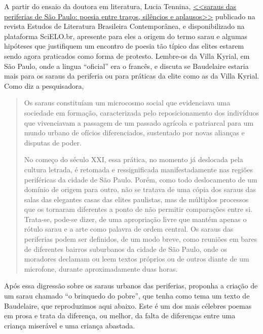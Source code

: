 \documentclass[12pt]{extarticle}
\begin{document}
A partir do ensaio da doutora em literatura, Lucia Tennina, 
\href{http://www.scielo.br/pdf/elbc/n42/01.pdf}{<<saraus das periferias de São Paulo:
poesia entre tragos, silêncios e aplausos>>} publicado na revista 
Estudos de Literatura Brasileira Contemporânea, e disponibilizado 
na plataforma SciELO.br, apresente para eles a origem do termo 
sarau e algumas hipóteses que justifiquem um encontro de poesia
tão típico das elites estarem sendo agora praticados como forma 
de protesto. Lembre-os da Villa Kyrial, em São Paulo, 
onde a lingua ``oficial'' era o francês, e discuta se Baudelaire 
estaria mais para os saraus da periferia ou para práticas 
da elite como as da Villa Kyrial. Como diz a pesquisadora, 

\begin{quote}
Os saraus constituíam um microcosmo social que evidenciava uma
sociedade em formação, caracterizada pelo reposicionamento dos indivíduos 
que vivenciavam a passagem de um passado agrícola e patriarcal
para um mundo urbano de ofícios diferenciados, sustentado por novas
alianças e disputas de poder.

No começo do século XXI, essa prática, no momento já deslocada pela
cultura letrada, é retomada e ressignificada manifestadamente nas regiões
periféricas da cidade de São Paulo. Porém, como todo deslocamento de
um domínio de origem para outro, não se tratava de uma cópia dos saraus
das salas das elegantes casas das elites paulistas, mas de múltiplos 
processos que os tornaram diferentes a ponto de não permitir comparações entre
si. Trata-se, pode-se dizer, de uma apropriação livre que mantém apenas o
rótulo sarau e a arte como palavra de ordem central.
Os saraus das periferias podem ser definidos, de um modo breve,
como reuniões em bares de diferentes bairros suburbanos da cidade de
São Paulo, onde os moradores declamam ou leem textos próprios ou de outros 
diante de um microfone, durante aproximadamente duas horas. 
\end{quote}

Após essa digressão sobre os saraus urbanos das periferias, proponha
a criação de um sarau chamado ``o brinquedo do pobre'', que tenha como tema um texto de Baudelaire,
que reproduzimos aqui abaixo. Este é um 
dos mais célebres poemas em prosa e trata da diferença, ou melhor, da 
falta de diferenças entre
uma criança miserável e uma criança abastada.
\end{document}
